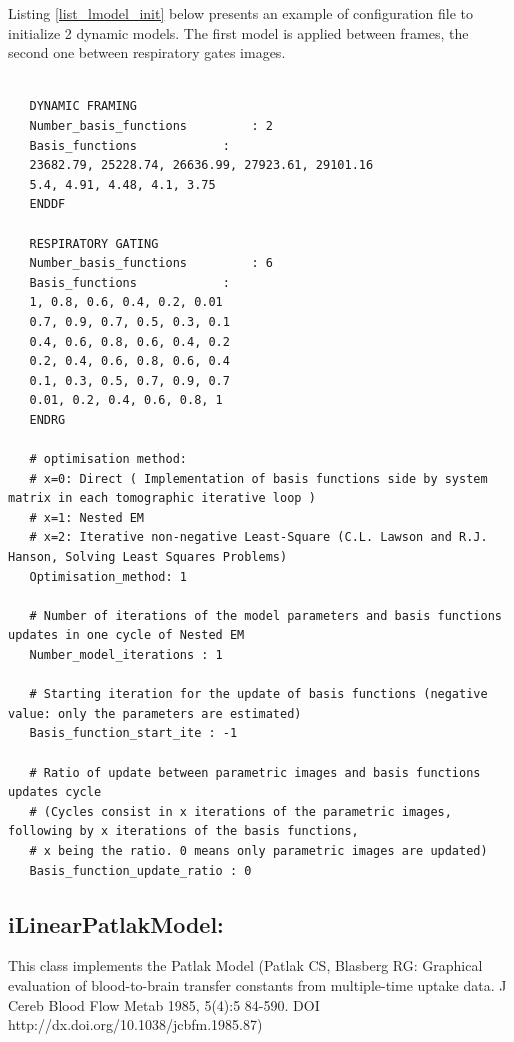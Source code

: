 \documentclass[a4paper, 11pt]{article}
\begin{document}
Listing \ref{list_lmodel_init} below presents an example of configuration file to initialize 2 dynamic models. The first model is applied between frames, the second one between respiratory gates images.
\bigskip

\clearpage
\begin{lstlisting}[label={list_lmodel_init},caption= Example of LinearModel initialization.]

   DYNAMIC FRAMING
   Number_basis_functions         : 2
   Basis_functions            :
   23682.79, 25228.74, 26636.99, 27923.61, 29101.16
   5.4, 4.91, 4.48, 4.1, 3.75
   ENDDF

   RESPIRATORY GATING
   Number_basis_functions         : 6
   Basis_functions            :
   1, 0.8, 0.6, 0.4, 0.2, 0.01
   0.7, 0.9, 0.7, 0.5, 0.3, 0.1
   0.4, 0.6, 0.8, 0.6, 0.4, 0.2
   0.2, 0.4, 0.6, 0.8, 0.6, 0.4
   0.1, 0.3, 0.5, 0.7, 0.9, 0.7
   0.01, 0.2, 0.4, 0.6, 0.8, 1
   ENDRG

   # optimisation method:
   # x=0: Direct ( Implementation of basis functions side by system matrix in each tomographic iterative loop )
   # x=1: Nested EM
   # x=2: Iterative non-negative Least-Square (C.L. Lawson and R.J. Hanson, Solving Least Squares Problems)
   Optimisation_method: 1

   # Number of iterations of the model parameters and basis functions updates in one cycle of Nested EM
   Number_model_iterations : 1

   # Starting iteration for the update of basis functions (negative value: only the parameters are estimated)
   Basis_function_start_ite : -1

   # Ratio of update between parametric images and basis functions updates cycle
   # (Cycles consist in x iterations of the parametric images, following by x iterations of the basis functions,
   # x being the ratio. 0 means only parametric images are updated)
   Basis_function_update_ratio : 0

\end{lstlisting}




\newpage
\subsection{iLinearPatlakModel:}
\label{ss_patlak}

This class implements the Patlak Model (Patlak CS, Blasberg RG: Graphical evaluation of blood-to-brain transfer constants from multiple-time uptake data. J Cereb Blood Flow Metab 1985, 5(4):5 84-590. DOI http://dx.doi.org/10.1038/jcbfm.1985.87)
\end{document}
